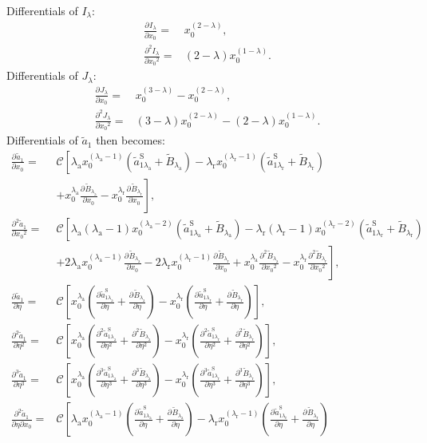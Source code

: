 \documentclass[english]{../thermomemo/thermomemo}
\newcommand*{\pd}[3][]{\frac{\partial^{#1}#2}{\partial{#3}^{#1}}}%
\newcommand*{\pdc}[3]{\frac{\partial^{2}#1}{\partial{#2}\partial{#3}}}%
\newcommand*{\lb}{\left(}
\newcommand*{\rb}{\right)}
\newcommand{\lama}{\ensuremath{{\lambda_{\text{a}}}}\xspace}
\newcommand{\lamr}{\ensuremath{{\lambda_{\text{r}}}}\xspace}
\newcommand{\Bt}{\ensuremath{\tilde{B}}\xspace}
\newcommand{\at}{\ensuremath{\tilde{a}}\xspace}
\newcommand*{\aSlt}[1]{\ensuremath{\tilde{a}_{1{#1}}^{\text{S}}}\xspace}
\begin{document}
Differentials of $I_\lambda$:
\begin{align}
  \label{eq:I_lam_diff}
  \pd{I_\lambda}{x_0} =& x_0^{\lb 2-\lambda\rb},\\
  \pd[2]{I_\lambda}{x_0} =& \lb 2-\lambda\rb x_0^{\lb 1-\lambda\rb}.
\end{align}
Differentials of $J_\lambda$:
\begin{align}
  \label{eq:J_lam_diff}
  \pd{J_\lambda}{x_0} =& x_0^{\lb 3-\lambda\rb} - x_0^{\lb 2-\lambda\rb},\\
  \pd[2]{J_\lambda}{x_0} =& \lb 3-\lambda\rb x_0^{\lb 2-\lambda\rb} - \lb 2-\lambda\rb x_0^{\lb 1-\lambda\rb}.
\end{align}
Differentials of $\at_1$ then becomes:
\begin{align}
  \label{eq:at_1_diff}
  \pd{\at_1}{x_0} =& \mathcal{C} \left[ \lama x_0^{\lb\lama -1 \rb} \lb \aSlt{\lama} + \Bt_\lama  \rb - \lamr x_0^{\lb\lamr -1 \rb} \lb \aSlt{\lamr} + \Bt_\lamr  \rb \right. \nonumber \\
  & \left. + x_0^{\lama} \pd{\Bt_\lama}{x_0}  - x_0^{\lamr} \pd{\Bt_\lamr}{x_0} \right],\\
  \pd[2]{\at_1}{x_0} =& \mathcal{C} \left[ \lama \lb\lama -1 \rb x_0^{\lb\lama -2 \rb} \lb \aSlt{\lama} + \Bt_\lama  \rb - \lamr \lb\lamr -1 \rb x_0^{\lb\lamr -2 \rb} \lb \aSlt{\lamr} + \Bt_\lamr  \rb \right. \nonumber\\
  & \left. + 2\lama x_0^{\lb\lama -1 \rb} \pd{\Bt_\lama}{x_0} - 2\lamr x_0^{\lb\lamr -1 \rb} \pd{\Bt_\lamr}{x_0} + x_0^{\lama} \pd[2]{\Bt_\lama}{x_0}  - x_0^{\lamr} \pd[2]{\Bt_\lamr}{x_0} \right],\\
  \pd{\at_1}{\eta} =& \mathcal{C} \left[ x_0^{\lama} \lb \pd{\aSlt{\lama}}{\eta} + \pd{\Bt_\lama}{\eta}  \rb - x_0^{\lamr} \lb \pd{\aSlt{\lamr}}{\eta} + \pd{\Bt_\lamr}{\eta}  \rb\right],\\
  \pd[2]{\at_1}{\eta} =& \mathcal{C} \left[ x_0^{\lama} \lb \pd[2]{\aSlt{\lama}}{\eta} + \pd[2]{\Bt_\lama}{\eta}  \rb - x_0^{\lamr} \lb \pd[2]{\aSlt{\lamr}}{\eta} + \pd[2]{\Bt_\lamr}{\eta}  \rb\right],\\
  \pd[3]{\at_1}{\eta} =& \mathcal{C} \left[ x_0^{\lama} \lb \pd[3]{\aSlt{\lama}}{\eta} + \pd[3]{\Bt_\lama}{\eta}  \rb - x_0^{\lamr} \lb \pd[3]{\aSlt{\lamr}}{\eta} + \pd[3]{\Bt_\lamr}{\eta}  \rb\right],\\
  \pdc{\at_1}{\eta}{x_0} =& \mathcal{C} \left[ \lama x_0^{\lb\lama -1 \rb} \lb \pd{\aSlt{\lama}}{\eta} + \pd{\Bt_\lama}{\eta}  \rb - \lamr x_0^{\lb\lamr -1 \rb} \lb \pd{\aSlt{\lamr}}{\eta} + \pd{\Bt_\lamr}{\eta}  \rb \right. \nonumber \\

\end{align}
\end{document}
